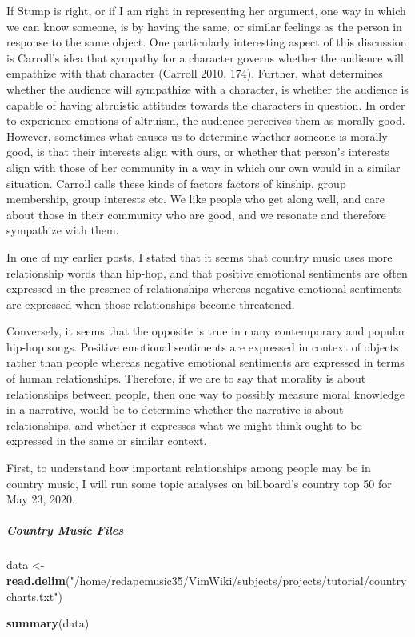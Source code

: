 \documentclass[]{article}
\newenvironment{Shaded}{\begin{snugshade}}{\end{snugshade}}
\newcommand{\KeywordTok}[1]{\textcolor[rgb]{0.13,0.29,0.53}{\textbf{#1}}}
\newcommand{\NormalTok}[1]{#1}
\newcommand{\StringTok}[1]{\textcolor[rgb]{0.31,0.60,0.02}{#1}}
\let\oldsubparagraph\subparagraph
\renewcommand{\subparagraph}[1]{\oldsubparagraph{#1}\mbox{}}
\begin{document}
If Stump is right, or if I am right in representing her argument, one
way in which we can know someone, is by having the same, or similar
feelings as the person in response to the same object. One particularly
interesting aspect of this discussion is Carroll's idea that sympathy
for a character governs whether the audience will empathize with that
character (Carroll 2010, 174). Further, what determines whether the
audience will sympathize with a character, is whether the audience is
capable of having altruistic attitudes towards the characters in
question. In order to experience emotions of altruism, the audience
perceives them as morally good. However, sometimes what causes us to
determine whether someone is morally good, is that their interests align
with ours, or whether that person's interests align with those of her
community in a way in which our own would in a similar situation.
Carroll calls these kinds of factors factors of kinship, group
membership, group interests etc. We like people who get along well, and
care about those in their community who are good, and we resonate and
therefore sympathize with them.

In one of my earlier posts, I stated that it seems that country music
uses more relationship words than hip-hop, and that positive emotional
sentiments are often expressed in the presence of relationships whereas
negative emotional sentiments are expressed when those relationships
become threatened.

Conversely, it seems that the opposite is true in many contemporary and
popular hip-hop songs. Positive emotional sentiments are expressed in
context of objects rather than people whereas negative emotional
sentiments are expressed in terms of human relationships. Therefore, if
we are to say that morality is about relationships between people, then
one way to possibly measure moral knowledge in a narrative, would be to
determine whether the narrative is about relationships, and whether it
expresses what we might think ought to be expressed in the same or
similar context.

First, to understand how important relationships among people may be in
country music, I will run some topic analyses on billboard's country top
50 for May 23, 2020.

\hypertarget{country-music-files}{%
\subparagraph{Country Music Files}\label{country-music-files}}

\begin{Shaded}
\begin{Highlighting}[]
\NormalTok{data <-}\StringTok{ }\KeywordTok{read.delim}\NormalTok{(}\StringTok{"/home/redapemusic35/VimWiki/subjects/projects/tutorial/countrycharts.txt"}\NormalTok{)}

\KeywordTok{summary}\NormalTok{(data)}
\end{Highlighting}
\end{Shaded}
\end{document}
